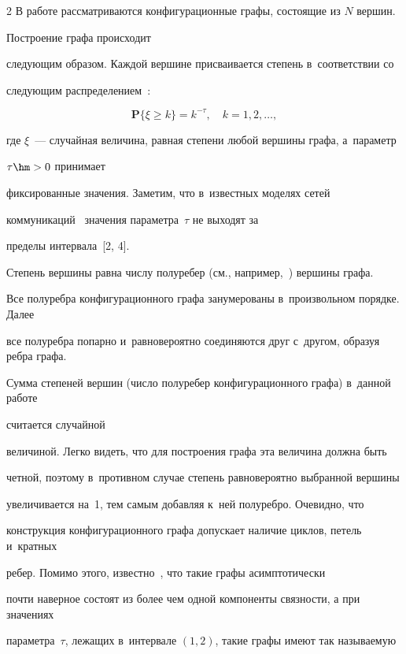 \begin{multicols}{2}
В работе рассматриваются конфигурационные графы, состоящие из $N$ вершин. 


Построение графа происходит


сле\-ду\-ющим образом. Каждой вершине присваивается степень в~соответствии со 


сле\-ду\-ющим распределением~\cite{RN}:


\begin{equation}


\label{eq1}


\mathbf{P}\{\xi \geqslant k\} = k^{-\tau}, \quad k=1,2,\dots,


\end{equation}


где $\xi$~--- случайная величина, равная степени любой вершины графа, а~параметр 


$\tau\hm>0$ принимает


фиксированные значения. Заметим, что в~известных моделях сетей 


коммуникаций~\cite{Dur, Hof1, Hof2, Fa, RN} значения параметра~$\tau$ не выходят за 


пределы интервала~[2, 4].


Степень вершины равна числу полуребер (см., например,~\cite{RN}) вершины графа.


Все полуребра конфигурационного графа занумерованы в~произвольном порядке. Далее 


все полуребра попарно и~равновероятно соединяются друг с~другом, образуя ребра графа.


Сумма степеней вершин (число полуребер конфигурационного графа) в~данной работе 


считается случайной


величиной. Легко видеть, что для построения графа эта величина должна быть 


четной, поэтому в~противном случае степень равновероятно выбранной вершины 


увеличивается на~1, тем самым добавляя к~ней полуребро. Очевидно, что 


конструкция конфигурационного графа допускает наличие циклов, петель и~кратных 


ребер. Помимо этого, известно~\cite{Dur, Hof1, RN}, что такие графы асимптотически 


почти наверное состоят из более чем одной компоненты связности, а при значениях 


параметра~$\tau$, лежащих в~интервале $(1,2)$, такие графы имеют так называемую 



\end{multicols}
